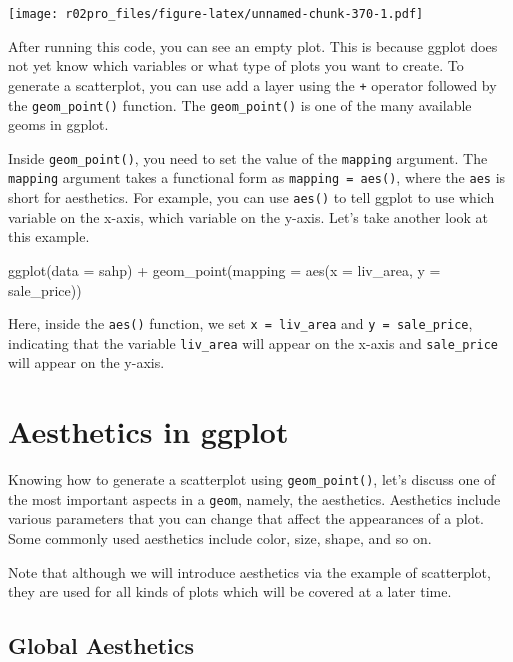 \documentclass[
]{book}
\newenvironment{Shaded}{\begin{snugshade}}{\end{snugshade}}
\newcommand{\AttributeTok}[1]{\textcolor[rgb]{0.77,0.63,0.00}{#1}}
\newcommand{\FunctionTok}[1]{\textcolor[rgb]{0.00,0.00,0.00}{#1}}
\newcommand{\NormalTok}[1]{#1}
\newcommand{\SpecialCharTok}[1]{\textcolor[rgb]{0.00,0.00,0.00}{#1}}
\begin{document}
\texttt{[image: r02pro\_files/figure-latex/unnamed-chunk-370-1.pdf]}

After running this code, you can see an empty plot. This is because ggplot does not yet know which variables or what type of plots you want to create. To generate a scatterplot, you can use add a layer using the \texttt{+} operator followed by the \texttt{geom\_point()} function. The \texttt{geom\_point()} is one of the many available geoms in ggplot.

Inside \texttt{geom\_point()}, you need to set the value of the \texttt{mapping} argument. The \texttt{mapping} argument takes a functional form as \texttt{mapping\ =\ aes()}, where the \texttt{aes} is short for aesthetics. For example, you can use \texttt{aes()} to tell ggplot to use which variable on the x-axis, which variable on the y-axis. Let's take another look at this example.

\begin{Shaded}
\begin{Highlighting}[]
\FunctionTok{ggplot}\NormalTok{(}\AttributeTok{data =}\NormalTok{ sahp) }\SpecialCharTok{+} \FunctionTok{geom\_point}\NormalTok{(}\AttributeTok{mapping =} \FunctionTok{aes}\NormalTok{(}\AttributeTok{x =}\NormalTok{ liv\_area, }\AttributeTok{y =}\NormalTok{ sale\_price))}
\end{Highlighting}
\end{Shaded}

Here, inside the \texttt{aes()} function, we set \texttt{x\ =\ liv\_area} and \texttt{y\ =\ sale\_price}, indicating that the variable \texttt{liv\_area} will appear on the x-axis and \texttt{sale\_price} will appear on the y-axis.

\hypertarget{aes}{%
\section{Aesthetics in ggplot}\label{aes}}

Knowing how to generate a scatterplot using \texttt{geom\_point()}, let's discuss one of the most important aspects in a \texttt{geom}, namely, the aesthetics. Aesthetics include various parameters that you can change that affect the appearances of a plot. Some commonly used aesthetics include color, size, shape, and so on.

Note that although we will introduce aesthetics via the example of scatterplot, they are used for all kinds of plots which will be covered at a later time.

\hypertarget{global-aes}{%
\subsection{Global Aesthetics}\label{global-aes}}
\end{document}
